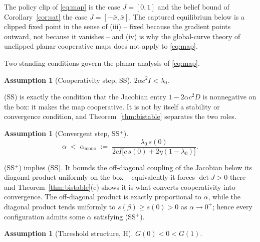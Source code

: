 \documentclass[11pt]{article}
\theoremstyle{definition}
\newtheorem{assumption}[theorem]{Assumption}
\theoremstyle{remark}
\numberwithin{equation}{section}
\begin{document}
The policy clip of \eqref{eq:map} is the case $J = [0,1]$ and the belief bound of Corollary~\ref{cor:sat} the case $J = [-\bar x, \bar x]$. The captured equilibrium below is a clipped fixed point in the sense of (iii) -- fixed because the gradient points outward, not because it vanishes -- and (iv) is why the global-curve theory of unclipped planar cooperative maps does not apply to \eqref{eq:map}.

Two standing conditions govern the planar analysis of \eqref{eq:map}.

\begin{assumption}[Cooperativity step, SS]\label{ass:ss}
$2\alpha c^2 I < \lambda_0$.
\end{assumption}

(SS) is exactly the condition that the Jacobian entry $1 - 2\alpha c^2 D$ is nonnegative on the box: it makes the map cooperative. It is not by itself a stability or convergence condition, and Theorem~\ref{thm:bistable} separates the two roles.

\begin{assumption}[Convergent step, SS$^+$]\label{ass:ssplus}
\begin{equation}\label{eq:ssplus}
\alpha \;<\; \alpha_{\mathrm{mono}} \;:=\; \frac{\lambda_0\, s(0)}{2cI\bigl[c\,s(0) + 2\eta(1-\lambda_0)\bigr]} .
\end{equation}
\end{assumption}

(SS$^+$) implies (SS). It bounds the off-diagonal coupling of the Jacobian below its diagonal product uniformly on the box -- equivalently it forces $\det J > 0$ there -- and Theorem~\ref{thm:bistable}(e) shows it is what converts cooperativity into convergence. The off-diagonal product is exactly proportional to $\alpha$, while the diagonal product tends uniformly to $s(\beta) \ge s(0) > 0$ as $\alpha\to0^+$; hence every configuration admits some $\alpha$ satisfying (SS$^+$).

\begin{assumption}[Threshold structure, H]\label{ass:H}
$G(0) < 0 < G(1)$.
\end{assumption}
\end{document}
